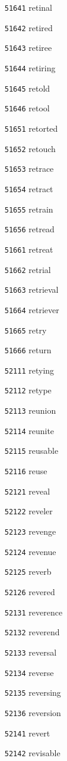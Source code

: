 \documentclass[twoside,11pt]{article}
\begin{document}
\begin{multicols}{5}
\begin{enumerate}
\item[\texttt{51641}] retinal
\item[\texttt{51642}] retired
\item[\texttt{51643}] retiree
\item[\texttt{51644}] retiring
\item[\texttt{51645}] retold
\item[\texttt{51646}] retool
\item[\texttt{51651}] retorted
\item[\texttt{51652}] retouch
\item[\texttt{51653}] retrace
\item[\texttt{51654}] retract
\item[\texttt{51655}] retrain
\item[\texttt{51656}] retread
\item[\texttt{51661}] retreat
\item[\texttt{51662}] retrial
\item[\texttt{51663}] retrieval
\item[\texttt{51664}] retriever
\item[\texttt{51665}] retry
\item[\texttt{51666}] return
\item[\texttt{52111}] retying
\item[\texttt{52112}] retype
\item[\texttt{52113}] reunion
\item[\texttt{52114}] reunite
\item[\texttt{52115}] reusable
\item[\texttt{52116}] reuse
\item[\texttt{52121}] reveal
\item[\texttt{52122}] reveler
\item[\texttt{52123}] revenge
\item[\texttt{52124}] revenue
\item[\texttt{52125}] reverb
\item[\texttt{52126}] revered
\item[\texttt{52131}] reverence
\item[\texttt{52132}] reverend
\item[\texttt{52133}] reversal
\item[\texttt{52134}] reverse
\item[\texttt{52135}] reversing
\item[\texttt{52136}] reversion
\item[\texttt{52141}] revert
\item[\texttt{52142}] revisable

\end{enumerate}
\end{multicols}
\end{document}
